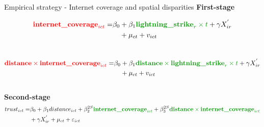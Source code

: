 \documentclass[10pt]{beamer}
\begin{document}
\begin{frame}{{\fontsize{13}{12}\selectfont
    Empirical strategy - Internet coverage and spatial disparities}}
    \centering \textbf{First-stage}

    \begin{equation}
        \begin{split}
            \textcolor{red}{\textbf{internet\_coverage}_{ict}} = & \beta_{0} + 
            \beta_{1} \textcolor[rgb]{0.0,0.6,0.0}{\textbf{lightning\_strike}_{r} \times t} + \gamma X^{'}_{ir} \\
            & \quad + \mu_{ct}+ v_{ict}
        \end{split}
        \end{equation}\\
    
    \begin{equation}
    \begin{split}
        \textcolor{red}{\textbf{distance} \times \textbf{internet\_coverage}_{ict}} = & \beta_{0} + 
        \beta_{1} \textcolor[rgb]{0.0,0.6,0.0}{\textbf{distance} \times \textbf{lightning\_strike}_{r} \times t} + \gamma X^{'}_{ir} \\
        & \quad + \mu_{ct}+ v_{ict}
    \end{split}
    \end{equation}\\

    \centering \textbf{Second-stage}
    \fontsize{8}{10}\selectfont
    \begin{equation}
        \begin{split}
        trust_{ict} = & \beta_{0} + \beta_{1} distance_{ict} + \beta_{2}^{2S}\textcolor[rgb]{0.0,0.6,0.0}{\textbf{internet\_coverage}_{ict}} + \beta_{3}^{2S}\textcolor[rgb]{0.0,0.6,0.0}{\textbf{distance} \times \textbf{internet\_coverage}_{ict}} \\
        & + \gamma X^{'}_{ir} + \mu_{ct}+ \varepsilon_{ict}
        \end{split}
        \end{equation}        
    
\end{frame}
\end{document}
